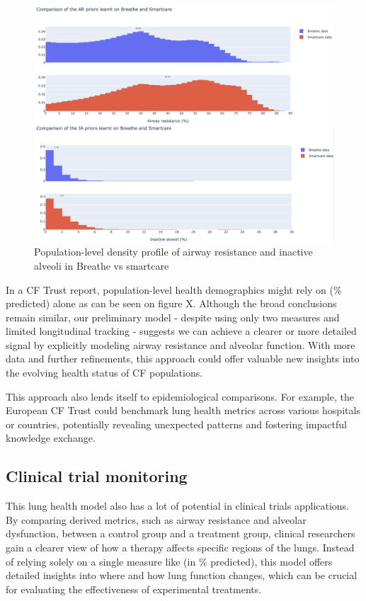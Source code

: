 \begin{figure}[!h]
    \centering
    \includegraphics[width=120mm]{Chapter1/Figs/epidemiology.png}
    \caption{Population-level density profile of airway resistance and inactive alveoli in Breathe vs smartcare }
    \label{fig:epidemiology}
\end{figure}

In a CF Trust report, population-level health demographics might rely on \F (\% predicted) alone as can be seen on figure X. Although the broad conclusions remain similar, our preliminary model - despite using only two measures and limited longitudinal tracking - suggests we can achieve a clearer or more detailed signal by explicitly modeling airway resistance and alveolar function. With more data and further refinements, this approach could offer valuable new insights into the evolving health status of CF populations.

This approach also lends itself to epidemiological comparisons. For example, the European CF Trust could benchmark lung health metrics across various hospitals or countries, potentially revealing unexpected patterns and fostering impactful knowledge exchange. 

\subsection{Clinical trial monitoring}

This lung health model also has a lot of potential in clinical trials applications. By comparing derived metrics, such as airway resistance and alveolar dysfunction, between a control group and a treatment group, clinical researchers gain a clearer view of how a therapy affects specific regions of the lungs. Instead of relying solely on a single measure like \F (in \% predicted), this model offers detailed insights into where and how lung function changes, which can be crucial for evaluating the effectiveness of experimental treatments.

